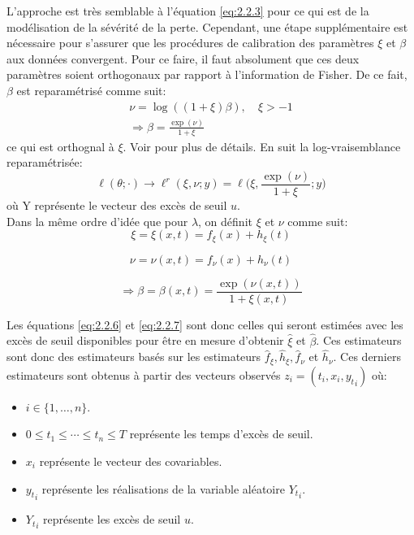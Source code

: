   L'approche est très semblable à l'équation \ref{eq:2.2.3} pour ce qui est de la modélisation de la sévérité de la perte. Cependant, une étape supplémentaire est nécessaire pour s'assurer que les procédures de calibration des paramètres $\xi$ et $\beta$ aux données convergent. Pour ce faire, il faut absolument que ces deux paramètres soient orthogonaux par rapport à l'information de Fisher. De ce fait, $\beta$ est reparamétrisé comme suit:
 \begin{equation}\label{eq:2.2.4}
 \begin{split}
  \nu = \log((1+\xi)\beta), & \ \xi > -1 \\ 
  \Rightarrow \beta = \frac{\exp(\nu)}{1+\xi}
  \end{split}
  \end{equation}
ce qui est orthognal à $\xi$. Voir \cite{cox1987parameter} pour plus de détails. En suit la log-vraisemblance reparamétrisée:
 \begin{equation}\label{eq:2.2.5}
 \ell(\theta; \cdot) \longrightarrow \ell^r(\xi, \nu; y) = \ell\Big(\xi, \frac{\exp(\nu)}{1+\xi}; y\Big)
 \end{equation}
où Y représente le vecteur des excès de seuil $u$. 
\\

Dans la même ordre d'idée que pour $\lambda$, on définit $\xi$ et $\nu$ comme suit:
\begin{equation}\label{eq:2.2.6}
 \xi = \xi(x, t) = f_\xi(x) + h_\xi(t)
\end{equation}
  
 \begin{equation}\label{eq:2.2.7}
 \nu = \nu(x, t) = f_\nu(x) + h_\nu(t)
 \end{equation}
 
  \begin{equation}\label{eq:2.2.8}
  \Rightarrow \beta = \beta(x, t) =  \frac{\exp(\nu(x,t))}{1+\xi(x,t)}
 \end{equation}

Les équations \ref{eq:2.2.6} et \ref{eq:2.2.7} sont donc celles qui seront estimées avec les excès de seuil disponibles pour être en mesure d'obtenir $\hat\xi$ et $\hat\beta$. Ces estimateurs sont donc des estimateurs basés sur les estimateurs $\hat{f}_\xi, \hat{h}_\xi, \hat{f}_\nu$ et $ \hat{h}_\nu$. Ces derniers estimateurs sont obtenus à partir des vecteurs observés $z_i = (t_i, x_i, {y_t}_{i})$ où:
\begin{itemize}
\item $i \in \{1, \dots, n\}$.
\item $0 \leq t_1 \le \cdots \le t_n \leq T$ représente les temps d'excès de seuil.
\item $x_i$ représente le vecteur des covariables.
\item ${y_t}_{i}$ représente les réalisations de la variable aléatoire ${Y_t}_{i}$.
\item ${Y_t}_{i}$ représente les excès de seuil $u$.
\end{itemize}

